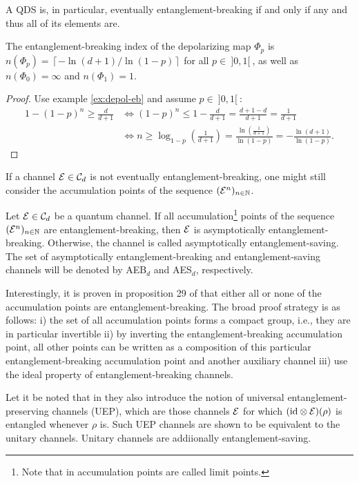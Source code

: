 A QDS is, in particular, eventually entanglement-breaking if and only if any and thus all of its elements are.

\begin{ex} The entanglement-breaking index of the depolarizing map $\Phi_p$ is $n(\Phi_p) = \left\lceil - {\ln(d+1)}/{\ln(1-p)} \right\rceil$ for all $p \in\ ]0, 1[\ $, as well as $n(\Phi_0) = \infty$ and $n(\Phi_1) = 1$. 
\end{ex}
\begin{proof}Use example \ref{ex:depol-eb} and assume $p \in\ ]0, 1[\ $:
\begin{align*}
1 - (1-p)^n \ge \frac{d}{d+1} &\Leftrightarrow (1-p)^n \le 1 - \frac{d}{d+1} = \frac{d+1-d}{d+1} = \frac{1}{d+1} \\
&\Leftrightarrow n \ge \log_{1-p} \left(\frac{1}{d+1}\right) = \frac{\ln\left(\frac{1}{d+1}\right)}{\ln(1-p)} = -\frac{\ln(d+1)}{\ln(1-p)}.
\end{align*}
\end{proof}


If a channel $\mathcal E \in \mathcal C_d$ is not eventually entanglement-breaking, one might still consider the accumulation points of the sequence $(\mathcal E^n)_{n\in \mathbb{N}}$.
\begin{definition}
    Let $\mathcal E \in \mathcal C_d$ be a quantum channel. If all accumulation\footnote{Note that in \cite{lamiEntanglementSavingChannels2016} accumulation points are called limit points.} points of the sequence $(\mathcal E^n)_{n \in \mathbb{N}}$ are entanglement-breaking, then $\mathcal E$ is asymptotically entanglement-breaking. Otherwise, the channel is called asymptotically entanglement-saving. The set of asymptotically entanglement-breaking and entanglement-saving channels will be denoted by AEB$_d$ and AES$_d$, respectively.
\end{definition}
Interestingly, it is proven in proposition 29 of \cite{lamiEntanglementSavingChannels2016} that either all or none of the accumulation points are entanglement-breaking. The broad proof strategy is as follows: i) the set of all accumulation points forms a compact group, i.e., they are in particular invertible ii) by inverting the entanglement-breaking accumulation point, all other points can be written as a composition of this particular entanglement-breaking accumulation point and another auxiliary channel iii) use the ideal property of entanglement-breaking channels.

Let it be noted that in \cite{lamiEntanglementSavingChannels2016} they also introduce the notion of universal entanglement-preserving channels (UEP), which are those channels $\mathcal E$ for which $(\mathrm{id} \otimes \mathcal E)(\rho)$ is entangled whenever $\rho$ is. Such UEP channels are shown to be equivalent to the unitary channels. Unitary channels are addiionally entanglement-saving.

